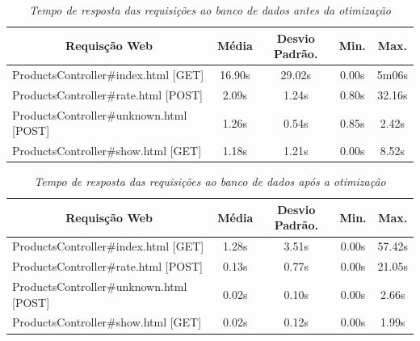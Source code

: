 \begin{table}[htbp]\centering
\begin{tabular}{l c c c c }\hline\hline
\multicolumn{1}{c}{\textbf{Requisção Web}}
& \textbf{Média}
& \textbf{Desvio Padrão.}
& \textbf{Min.} 
& \textbf{Max.} \\ \hline
ProductsController\#index.html [GET]    & 16.90s & 29.02s &  0.00s &  5m06s \\
ProductsController\#rate.html [POST]    &  2.09s &  1.24s &  0.80s & 32.16s \\
ProductsController\#unknown.html [POST] &  1.26s &  0.54s &  0.85s &  2.42s \\
ProductsController\#show.html [GET]     &  1.18s &  1.21s &  0.00s &  8.52s \\
\end{tabular}
\hline
\caption{\it Tempo de resposta das requisições ao banco de dados antes da otimização \label{table:before_stats}}
\end{table}

\begin{table}[htbp]\centering
\begin{tabular}{l c c c c }\hline\hline
\multicolumn{1}{c}{\textbf{Requisção Web}}
& \textbf{Média}
& \textbf{Desvio Padrão.}
& \textbf{Min.} 
& \textbf{Max.} \\ \hline
ProductsController\#index.html [GET]    & 1.28s &  3.51s &  0.00s & 57.42s \\
ProductsController\#rate.html [POST]    & 0.13s &  0.77s &  0.00s & 21.05s \\
ProductsController\#unknown.html [POST] & 0.02s &  0.10s &  0.00s &  2.66s \\
ProductsController\#show.html [GET]     & 0.02s &  0.12s &  0.00s &  1.99s \\
\end{tabular}
\hline
\caption{\it Tempo de resposta das requisições ao banco de dados após a otimização \label{table:after_stats}}
\end{table}

